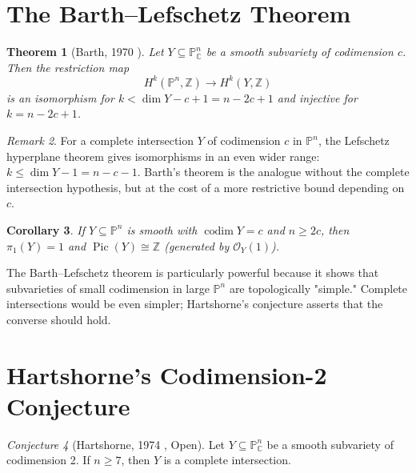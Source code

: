 \documentclass[12pt,a4paper]{amsart}
\newtheorem{theorem}{Theorem}[section]
\newtheorem{corollary}[theorem]{Corollary}
\theoremstyle{definition}
\theoremstyle{remark}
\newtheorem{remark}[theorem]{Remark}
\newtheorem{conjecture}[theorem]{Conjecture}
\DeclareMathOperator{\codim}{codim}
\DeclareMathOperator{\Pic}{Pic}
\newcommand{\PP}{\mathbb{P}}
\newcommand{\ZZ}{\mathbb{Z}}
\newcommand{\CC}{\mathbb{C}}
\newcommand{\OO}{\mathcal{O}}
\begin{document}
\section{The Barth--Lefschetz Theorem}

\begin{theorem}[Barth, 1970 \cite{Barth1970}]
\label{thm:barth}
Let $Y \subseteq \PP^n_\CC$ be a smooth subvariety of codimension $c$.
Then the restriction map
\[
  H^k(\PP^n, \ZZ) \longrightarrow H^k(Y, \ZZ)
\]
is an isomorphism for $k < \dim Y - c + 1 = n - 2c + 1$ and injective for
$k = n - 2c + 1$.
\end{theorem}

\begin{remark}
For a complete intersection $Y$ of codimension $c$ in $\PP^n$, the
Lefschetz hyperplane theorem gives isomorphisms in an even wider range:
$k \le \dim Y - 1 = n - c - 1$.  Barth's theorem is the analogue without
the complete intersection hypothesis, but at the cost of a more restrictive
bound depending on $c$.
\end{remark}

\begin{corollary}
If $Y \subseteq \PP^n$ is smooth with $\codim Y = c$ and $n \ge 2c$, then
$\pi_1(Y) = 1$ and $\Pic(Y) \cong \ZZ$ (generated by $\OO_Y(1)$).
\end{corollary}

The Barth--Lefschetz theorem is particularly powerful because it shows that
subvarieties of small codimension in large $\PP^n$ are topologically
"simple."  Complete intersections would be even simpler; Hartshorne's
conjecture asserts that the converse should hold.

\section{Hartshorne's Codimension-2 Conjecture}

\begin{conjecture}[Hartshorne, 1974 \cite{Hartshorne1974}, Open]
\label{conj:hartshorne}
Let $Y \subseteq \PP^n_\CC$ be a smooth subvariety of codimension 2.  If
$n \ge 7$, then $Y$ is a complete intersection.
\end{conjecture}
\end{document}
